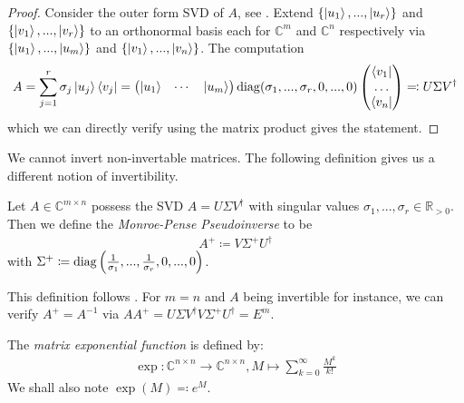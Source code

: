 \begin{proof}
    Consider the outer form SVD of \(A\), see . Extend \(\{\ket{u_1}, ..., \ket{u_r}\}\) and \(\{\ket{v_1}, ..., \ket{v_r}\}\) to an orthonormal basis each for \(\mathbb{C}^m\) and \(\mathbb{C}^n\) respectively via \(\{\ket{u_1}, ..., \ket{u_m}\}\) and \(\{\ket{v_1}, ..., \ket{v_n}\}\). The computation
    \begin{align}
        A = \sum_{j=1}^r \sigma_j \ket{u_j}\bra{v_j} = \begin{pmatrix}
            \ket{u_1} & \cdots & \ket{u_m}
        \end{pmatrix} \operatorname{diag}(\sigma_1, ..., \sigma_r, 0, ..., 0) \begin{pmatrix}
            \bra{v_1}\\
            \hdots\\
            \bra{v_n}
        \end{pmatrix} \eqqcolon U \Sigma V^\dagger
    \end{align}
    which we can directly verify using the matrix product gives the statement.
\end{proof}

We cannot invert non-invertable matrices. The following definition gives us a different notion of invertibility.

\begin{definition} \label{moore_penrose_pseudoinverse}
    Let \(A \in \mathbb{C}^{m \times n}\) possess the SVD \(A = U \Sigma V^\dagger\) with singular values \(\sigma_1, ..., \sigma_r \in \mathbb{R}_{> 0}\). Then we define the \emph{Monroe-Pense Pseudoinverse} to be
    \begin{align}
        A^+ \coloneqq V \Sigma^+ U^\dagger
    \end{align}
    with \(\Sigma^+ \coloneqq \operatorname{diag}\left(\frac{1}{\sigma_1}, ..., \frac{1}{\sigma_r}, 0, ..., 0\right)\).
\end{definition}

This definition follows \cite[pp. 41-42]{Dervovic2018}. For \(m = n\) and \(A\) being invertible for instance, we can verify \(A^+ = A^{-1}\) via \(AA^+ = U \Sigma V^\dagger V \Sigma^+ U^\dagger = E^m\).

\begin{definition} \label{definition_matrix_exponential_function}
    The \emph{matrix exponential function}  is defined by:
    \begin{align}
        \exp\colon \mathbb{C}^{n \times n} \to \mathbb{C}^{n \times n}, M \mapsto \sum_{k=0}^\infty \frac{M^k}{k!}
    \end{align}
    We shall also note \(\exp(M) \eqqcolon e^M\).
\end{definition}

